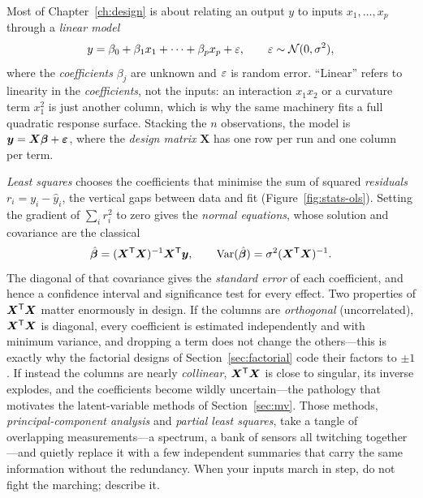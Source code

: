 Most of Chapter~\ref{ch:design} is about relating an output $y$ to inputs
$x_1,\dots,x_p$ through a \emph{linear model}
%
\begin{equation}
y = \beta_0 + \beta_1 x_1 + \dots + \beta_p x_p + \varepsilon,
\qquad \varepsilon\sim\mathcal N(0,\sigma^2),
\label{eq:linmodel}
\end{equation}
%
where the \emph{coefficients} $\beta_j$ are unknown and $\varepsilon$ is random error.
``Linear'' refers to linearity in the \emph{coefficients}, not the inputs: an
interaction $x_1x_2$ or a curvature term $x_1^2$ is just another column, which is
why the same machinery fits a full quadratic response surface. Stacking the $n$
observations, the model is $\bm y = \bm X\bm\beta + \bm{\varepsilon}$, where the
\emph{design matrix} $\bm X$ has one row per run and one column per term.

\emph{Least squares} chooses the coefficients that minimise the sum of squared
\emph{residuals} $r_i = y_i-\hat y_i$, the vertical gaps between data and fit
(Figure~\ref{fig:stats-ols}). Setting the gradient of $\sum_i r_i^2$ to zero
gives the \emph{normal equations}, whose solution and covariance are the
classical
%
\begin{equation}
\hat{\bm\beta} = (\bm X^{\mathsf{T}}\bm X)^{-1}\bm X^{\mathsf{T}}\bm y,
\qquad
\operatorname{Var}(\hat{\bm\beta}) = \sigma^2(\bm X^{\mathsf{T}}\bm X)^{-1}.
\label{eq:normaleq}
\end{equation}
%
The diagonal of that covariance gives the \emph{standard error} of each
coefficient, and hence a confidence interval and significance test for every
effect. Two properties of $\bm X^{\mathsf{T}}\bm X$ matter enormously in design. If the
columns are \emph{orthogonal} (uncorrelated), $\bm X^{\mathsf{T}}\bm X$ is diagonal,
every coefficient is estimated independently and with minimum variance, and
dropping a term does not change the others---this is exactly why the factorial
designs of Section~\ref{sec:factorial} code their factors to $\pm1$. If instead
the columns are nearly \emph{collinear}, $\bm X^{\mathsf{T}}\bm X$ is close to singular,
its inverse explodes, and the coefficients become wildly uncertain---the
pathology that motivates the latent-variable methods of Section~\ref{sec:mv}.
Those methods, \emph{principal-component analysis} and \emph{partial least
squares}, take a tangle of overlapping measurements---a spectrum, a bank of
sensors all twitching together---and quietly replace it with a few independent
summaries that carry the same information without the redundancy. When your
inputs march in step, do not fight the marching; describe it.

